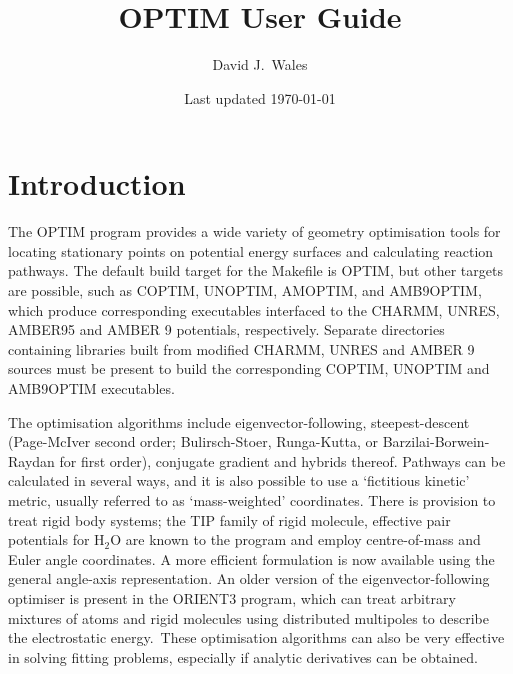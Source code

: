 \documentclass[12pt,a4paper,dvips]{article}
\begin{document}
% 

\title{OPTIM User Guide}
\author{David J.~Wales}
\date{Last updated \today}
\maketitle

\clearpage
{}
{} %
\tableofcontents

\section{Introduction}
\label{sec:intro}

The OPTIM program provides a wide variety of geometry optimisation tools
for locating stationary points on potential energy 
surfaces and calculating reaction pathways. \cite{Wales03}
The default build target for the Makefile is OPTIM, but other targets are 
possible, such as COPTIM, UNOPTIM, AMOPTIM, and AMB9OPTIM, which produce corresponding executables interfaced 
to the CHARMM,\cite{mackerellbbdeffgghjkklmmnnprrsssswwyk98,lazaridisk99}
UNRES,
AMBER95\cite{cornellcbgmfsfck95} and AMBER 9 potentials, respectively.
Separate directories containing libraries built from modified CHARMM, UNRES and AMBER 9 sources must 
be present to build the corresponding COPTIM, UNOPTIM and AMB9OPTIM executables.

The optimisation algorithms include eigenvector-following,
\cite{pancir74,cerjanm81,simonsjto83,onealts84,banerjeeass85,baker86,baker87} steepest-descent 
(Page-McIver second order; Bulirsch-Stoer, Runga-Kutta, or 
Barzilai-Borwein-Raydan\cite{BB-IMAJNA-1988,Raydan-SIAMJO-1997} for first order),
conjugate gradient and hybrids thereof.
Pathways can be calculated in several ways, and it is also possible to
use a `fictitious kinetic' metric,
usually referred to as `mass-weighted' coordinates.
There is provision to treat rigid body systems; the
TIP family of rigid molecule, effective pair potentials for H$_2$O are known to
the program and employ centre-of-mass and Euler angle coordinates. 
A more efficient formulation is now available using the general angle-axis
representation.\cite{Wales05,ChakrabartiW09}
An older version of the eigenvector-following optimiser is present in the ORIENT3 program, which can treat 
arbitrary mixtures of atoms and rigid molecules using distributed multipoles to
describe the electrostatic energy.\cite{stone81,stonea85}\
These optimisation algorithms can also be
very effective in solving fitting problems, especially if analytic derivatives 
can be obtained.
\end{document}
